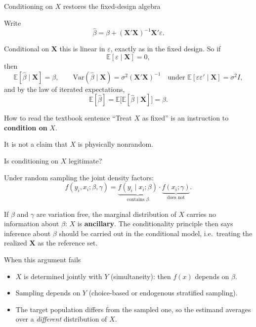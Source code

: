 \documentclass[aspectratio=169,11pt]{beamer}
\newcommand{\E}{\mathbb{E}}
\begin{document}
\begin{frame}{Conditioning on $X$ restores the fixed-design algebra}

Write
\[
\hat\beta = \beta + (\bm X'\bm X)^{-1}\bm X'\varepsilon.
\]

Conditional on $\bm X$ this is linear in $\varepsilon$, exactly as in the fixed design.
So if
\[
\E[\varepsilon\mid \bm X]=0,
\]
then
\[
\E[\hat\beta\mid \bm X]=\beta,
\qquad
\mathrm{Var}(\hat\beta\mid \bm X)=\sigma^2(\bm X'\bm X)^{-1}
\quad\text{under }\E[\varepsilon\varepsilon'\mid \bm X]=\sigma^2 I,
\]
and by the law of iterated expectations,
\[
\E[\hat\beta]=\E\big[\E[\hat\beta\mid \bm X]\big]=\beta.
\]

\vspace{0.3em}

\begin{alertblock}{How to read the textbook sentence}
``Treat $X$ as fixed'' is an instruction to \textbf{condition on} $X$.

It is not a claim that $X$ is physically nonrandom.
\end{alertblock}

\end{frame}

\begin{frame}{Is conditioning on $X$ legitimate?}

Under random sampling the joint density factors:
\[
f(y_i,x_i;\beta,\gamma)
=
\underbrace{f(y_i\mid x_i;\beta)}_{\text{contains }\beta}
\cdot
\underbrace{f(x_i;\gamma)}_{\text{does not}}.
\]

If $\beta$ and $\gamma$ are variation free, the marginal distribution of $X$ carries
no information about $\beta$: $X$ is \textbf{ancillary}. The conditionality principle
then says inference about $\beta$ should be carried out in the conditional model,
i.e.\ treating the realized $\bm X$ as the reference set.

\vspace{0.3em}

\begin{block}{When this argument fails}
\begin{itemize}
    \item $X$ is determined jointly with $Y$ (simultaneity): then $f(x)$ depends on $\beta$.
    \item Sampling depends on $Y$ (choice-based or endogenous stratified sampling).
    \item The target population differs from the sampled one, so the estimand averages
    over a \emph{different} distribution of $X$.
\end{itemize}
\end{block}

\end{frame}
\end{document}
